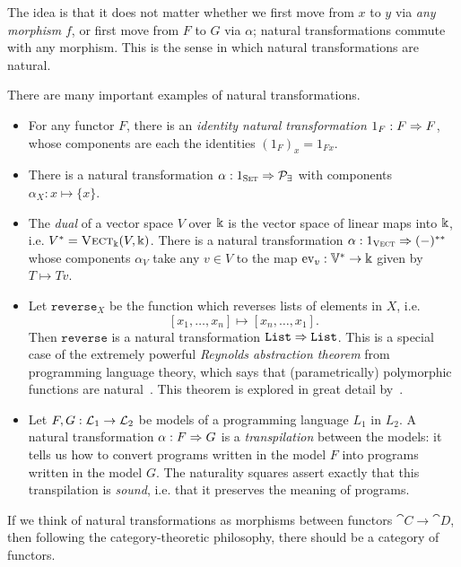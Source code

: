 The idea is that it does not matter whether we first move from $x$ to $y$ via
\emph{any morphism} $f$, or first move from $F$ to $G$ via $\alpha$; natural
transformations commute with any morphism. This is the sense in which natural
transformations are natural.

\begin{ex}
  There are many important examples of natural transformations.
  \begin{itemize}
    \item For any functor $F$, there is an \emph{identity natural transformation
      $1_F: F\Rightarrow F$}, whose components are each the identities $(1_F)_x = 1_{Fx}$.
    \item There is a natural transformation $\alpha: 1_{\textsc{\text{Set}}}\Rightarrow
      \mathcal{P}_\exists$ with components $\alpha_X: x\mapsto \{x\}$.
    \item The \emph{dual} of a vector space $V$ over $\Bbbk$ is the vector space
      of linear maps into $\Bbbk$, i.e. $V^* = {\textsc{\text{Vect}}}_\Bbbk(V, \Bbbk)$. There is
      a natural transformation $\alpha: 1_{{\textsc{\text{Vect}}}}\Rightarrow (-)^{**}$ whose
      components $\alpha_V$ take any $v\in V$ to the map $\text{ev}_v:
      \mathbb{V}^*\to\Bbbk$ given by $T\mapsto Tv$.
    \item Let $\texttt{reverse}_X$ be the function which reverses lists of
      elements in $X$, i.e. \[
        [x_1, \ldots, x_n]\mapsto [x_n, \ldots, x_1].
      \] Then $\texttt{reverse}$ is a natural transformation $\texttt{List}\Rightarrow
      \texttt{List}$. This is a special case of the extremely powerful
      \emph{Reynolds abstraction theorem} from programming language theory,
      which says that (parametrically) polymorphic functions are
      natural~\cite{reynolds-1983}. This theorem is explored in great detail
      by~\cite{wadler-1989}.
    \item Let $F,G:\mathcal{L}_1\to\mathcal{L}_2$ be models of a programming language $L_1$ in
      $L_2$. A natural transformation $\alpha: F\Rightarrow G$ is a \emph{transpilation}
      between the models: it tells us how to convert programs written in the
      model $F$ into programs written in the model $G$. The naturality squares
      assert exactly that this transpilation is \emph{sound}, i.e. that it
      preserves the meaning of programs.
 \end{itemize}
\end{ex}

If we think of natural transformations as morphisms between functors
$\cat{C}\to\cat{D}$, then following the category-theoretic philosophy, there
should be a category of functors.

